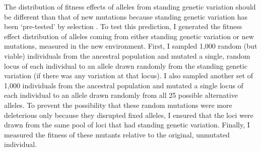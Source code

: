 \begin{doublespace}



The distribution of fitness effects of alleles
from standing genetic variation should be different
than that of new mutations because standing genetic variation
has been `pre-tested' by selection \citep{bar08}.
%
To test this prediction,
I generated the fitness effect distribution
of alleles coming from either standing genetic variation
or new mutations, measured in the new environment.
%
First, I sampled 1,000 random (but viable)
individuals from the ancestral population
and mutated a single, random locus of each individual
to an allele drawn randomly from the standing genetic variation
(if there was any variation at that locus).
%
I also sampled another set of 1,000
individuals from the ancestral population
and mutated a single locus of each individual
to an allele drawn randomly from all 25 possible alternative alleles.
%
To prevent the possibility that these random mutations
were more deleterious only because they disrupted fixed alleles,
I ensured that the loci were drawn from the same pool
of loci that had standing genetic variation.
%
Finally, I measured the fitness of these mutants
relative to the original, unmutated individual.




\end{doublespace}
